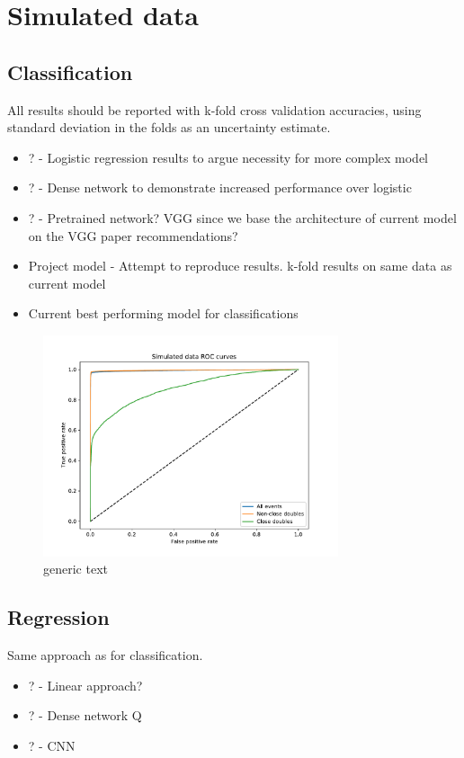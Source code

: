 \section{Simulated data}
\subsection{Classification}

All results should be reported with k-fold cross validation accuracies, using
standard deviation in the folds as an uncertainty estimate.
\begin{itemize}
  \item ? - Logistic regression results to argue necessity for more complex model
  \item ? - Dense network to demonstrate increased performance over logistic
  \item ? - Pretrained network? VGG since we base the architecture of current model on the VGG paper recommendations?
  \item Project model - Attempt to reproduce results. k-fold results on same data as current model
  \item Current best performing model for classifications
\end{itemize}

\begin{figure}
\centering
\includegraphics[width=0.8    \textwidth, height=6.5cm]{chapters/results/figures/roc_simulated.pdf}
\caption[Titletext]{generic text}\label{fig:roc_simulated}
\end{figure}

\subsection{Regression}
Same approach as for classification.
\begin{itemize}
  \item ? - Linear approach?
  \item ? - Dense network                                                                   Q
  \item ? - CNN
\end{itemize}

